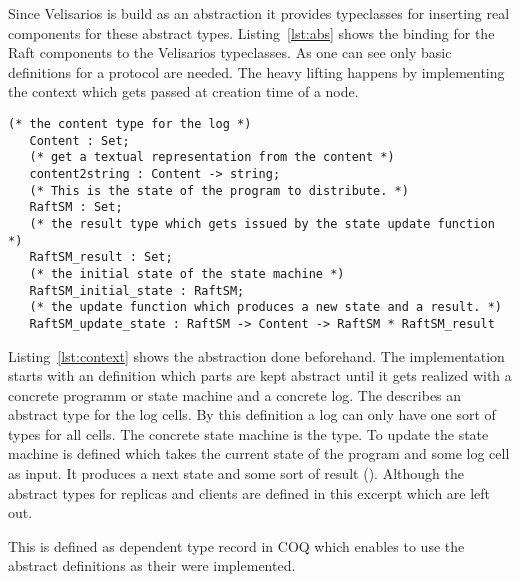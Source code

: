 Since Velisarios is build as an abstraction it provides typeclasses
for inserting real components for these abstract types. Listing~\ref{lst:abs}
shows the binding for the Raft components to the Velisarios typeclasses.
As one can see only basic definitions for a protocol are needed.
The heavy lifting happens by implementing the context which
gets passed at creation time of a node.


\begin{lstlisting}[style=coq,label=lst:context,
caption=Excerpt of the context definition of types and functions used within
the protocol.]
   (* the content type for the log *)
   Content : Set;
   (* get a textual representation from the content *)
   content2string : Content -> string;
   (* This is the state of the program to distribute. *)
   RaftSM : Set;
   (* the result type which gets issued by the state update function *)
   RaftSM_result : Set;
   (* the initial state of the state machine *)
   RaftSM_initial_state : RaftSM;
   (* the update function which produces a new state and a result. *)
   RaftSM_update_state : RaftSM -> Content -> RaftSM * RaftSM_result
\end{lstlisting}

Listing~\ref{lst:context} shows the abstraction done beforehand. The
implementation starts with an definition which parts are kept abstract
until it gets realized with a concrete programm or state machine and
a concrete log. The  describes an abstract type for the log
cells. By this definition a log can only have one sort of types for all cells.
The concrete state machine is the  type. To update the state
machine  is defined which takes the current
state of the program and some log cell as input. It produces a next
state and some sort of result (). Although the abstract
types for replicas and clients are defined in this excerpt which are left out. 

This is defined as dependent type record in COQ which enables to use the
abstract definitions as their were implemented. 



